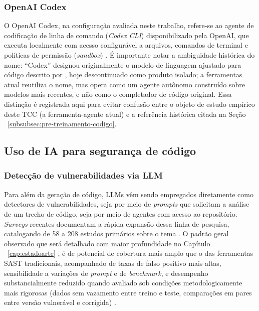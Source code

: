 \subsubsection{OpenAI Codex}\label{subsubsec:openai-codex}
O OpenAI Codex, na configuração avaliada neste trabalho, refere-se ao agente de codificação de linha de comando (\textit{Codex CLI}) disponibilizado pela OpenAI, que executa localmente com acesso configurável a arquivos, comandos de terminal e políticas de permissão (\textit{sandbox}) \cite{OpenAI2025CodexDocs}. É importante notar a ambiguidade histórica do nome: ``Codex'' designou originalmente o modelo de linguagem ajustado para código descrito por , hoje descontinuado como produto isolado; a ferramentas atual reutiliza o nome, mas opera como um agente autônomo construído sobre modelos mais recentes, e não como o completador de código original. Essa distinção é registrada aqui para evitar confusão entre o objeto de estudo empírico deste TCC (a ferramenta-agente atual) e a referência histórica citada na Seção ~\ref{subsubsec:pre-treinamento-codigo}.


\subsection{Uso de IA para segurança de código}\label{subsec:ia-seguranca-codigo}
\subsubsection{Detecção de vulnerabilidades via LLM}\label{subsubsec:deteccao-llm}
Para além da geração de código, LLMs vêm sendo empregados diretamente como detectores de vulnerabilidades, seja por meio de \textit{prompts} que solicitam a análise de um trecho de código, seja por meio de agentes com acesso ao repositório. \textit{Surveys} recentes documentam a rápida expansão dessa linha de pesquisa, catalogando de 58 a 208 estudos primários sobre o tema \cite{Sheng2025LLMSurvey, Zhou2025LLMReview, Germano2025LLMSLR}. O padrão geral observado que será detalhado com maior profundidade no Capítulo ~\ref{cap:estadoarte} , é de potencial de cobertura mais amplo que o das ferramentas SAST tradicionais, acompanhado de taxas de falso positivo mais altas, sensibilidade a variações de \textit{prompt} e de \textit{benchmark}, e desempenho substancialmente reduzido quando avaliado sob condições metodologicamente mais rigorosas (dados sem vazamento entre treino e teste, comparações em pares entre versão vulnerável e corrigida) \cite{Ding2025CodeLMVuln, Khare2025LLMEffectiveness}.

